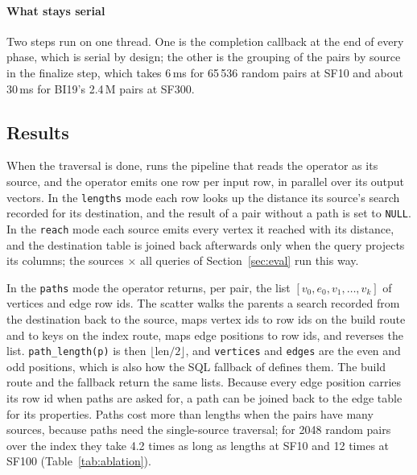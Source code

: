 \paragraph{What stays serial} Two steps run on one thread. One is the completion callback at the end of every phase, which is
serial by design; the other is the grouping of the pairs by source in the finalize step, which takes 6\,ms for 65\,536 random pairs at SF10 and about
30\,ms for BI19's 2.4\,M pairs at SF300.

\subsection{Results}
\label{sec:results}

When the traversal is done, \duckdb runs the pipeline that reads the operator as its source, and the operator emits
one row per input row, in parallel over its output vectors. In the \texttt{lengths} mode each row looks up the distance its
source's search recorded for its destination, and the result of a pair without a path is set to \texttt{NULL}. In the \texttt{reach} mode each source emits every vertex it reached with its distance, and the destination table is
joined back afterwards only when the query projects its columns; the sources $\times$ all queries of
Section~\ref{sec:eval} run this way.

In the \texttt{paths} mode the operator returns, per pair, the list $[v_0, e_0, v_1, \dots, v_k]$ of vertices and edge row
ids. The scatter walks the parents a search recorded from the destination back to the source, maps vertex ids to row
ids on the build route and to keys on the index route, maps edge positions to row ids, and reverses the list.
\texttt{path\_length(p)} is then $\lfloor\text{len}/2\rfloor$, and \texttt{vertices} and \texttt{edges} are the even
and odd positions, which is also how the SQL fallback of \duckpgq defines them. The build route and the fallback return the same
lists. Because every edge position carries its row id when paths are asked for, a path can be joined
back to the edge table for its properties. Paths cost more than lengths when the pairs have many sources, because
paths need the single-source traversal; for 2048 random pairs over the index they take 4.2 times as long as lengths at SF10 and 12 times at SF100 (Table~\ref{tab:ablation}).
